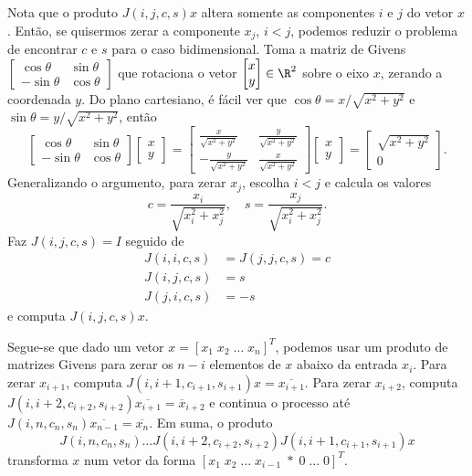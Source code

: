 \documentclass{article}
\begin{document}
Nota que o produto \(J(i,j,c,s)x\) altera somente as componentes \(i\) e \(j\) do vetor \(x\). Então, se quisermos zerar a componente \(x_j\), \(i<j\), podemos reduzir o problema de encontrar \(c\) e \(s\) para o caso bidimensional. Toma a matriz de Givens \(\begin{bmatrix} \cos \theta & \sin \theta \\ -\sin \theta & \cos \theta\end{bmatrix}\) que rotaciona o vetor \(\begin{bmatrix} x \\ y\end{bmatrix} \in \R^2\) sobre o eixo \(x\), zerando a coordenada \(y\).
Do plano cartesiano, é fácil ver que \(\cos \theta = x/\sqrt{x^2+y^2}\) e \(\sin \theta = y/\sqrt{x^2+y^2}\), então 
\[
    \begin{bmatrix}
        \cos \theta & \sin \theta \\
        -\sin \theta & \cos \theta
    \end{bmatrix}
    \begin{bmatrix}
        x \\
        y
    \end{bmatrix}
    =
    \begin{bmatrix}
        \frac{x}{\sqrt{x^2+y^2}} & \frac{y}{\sqrt{x^2+y^2}} \\
        -\frac{y}{\sqrt{x^2+y^2}} & \frac{x}{\sqrt{x^2+y^2}}
    \end{bmatrix}
    \begin{bmatrix}
        x \\
        y
    \end{bmatrix}
    =
    \begin{bmatrix}
        \sqrt{x^2+y^2} \\
        0
    \end{bmatrix}.
\]
Generalizando o argumento, para zerar \(x_j\), escolha \(i<j\) e calcula os valores 
\[
    c=\frac{x_i}{\sqrt{x_i^2+x_j^2}}, \quad s=\frac{x_j}{\sqrt{x_i^2+x_j^2}}.
\] 
Faz \(J(i,j,c,s)=I\) seguido de
\begin{align*}
    J(i,i,c,s) &= J(j,j,c,s) = c \\
    J(i,j,c,s) &= s \\
    J(j,i,c,s) &= -s
\end{align*}
e computa \(J(i,j,c,s)x\). 

Segue-se que dado um vetor \(x=[x_1 \; x_2 \; \ldots \; x_n]^T\), podemos usar um produto de matrizes Givens para zerar os \(n-i\) elementos de \(x\) abaixo da entrada \(x_i\). Para zerar \(x_{i+1}\), computa \(J(i,i+1,c_{i+1},s_{i+1})x=\allowbreak \overline{x_{i+1}}\). Para zerar \(x_{i+2}\), computa \(J(i,i+2,c_{i+2},s_{i+2})\overline{x_{i+1}}=\overline{x}_{i+2}\) e continua o processo até \(J(i,n,c_n,s_n)\overline{x_{n-1}}=\overline{x_n}\). Em suma, o produto
\[
    J(i,n,c_n,s_n) \ldots J(i,i+2,c_{i+2},s_{i+2}) J(i,i+1,c_{i+1},s_{i+1})x
\]
transforma \(x\) num vetor da forma \([x_1 \; x_2 \; \ldots \; x_{i-1} \; * \; 0 \; \ldots \; 0]^T\).
\end{document}

